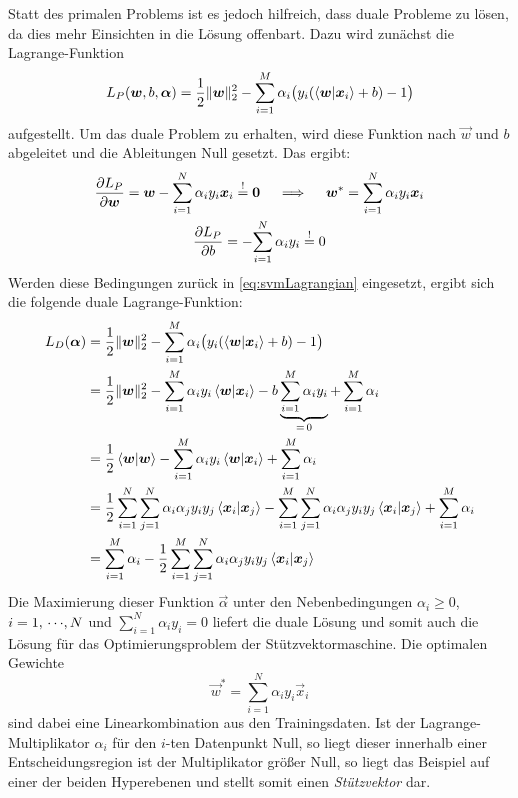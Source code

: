 				Statt des primalen Problems ist es jedoch hilfreich, dass duale Probleme zu lösen, da dies mehr Einsichten in die Lösung offenbart. Dazu wird zunächst die Lagrange-Funktion
				\begin{equation}
					L_P(\bm{w}, b, \bm{\alpha}) = \frac{1}{2} \lVert \bm{w} \rVert_2^2 - \sum_{i = 1}^{M} \alpha_i \big( y_i (\braket{\bm{w}}{\bm{x}_i} + b) - 1 \big)  \label{eq:svmLagrangian}
				\end{equation}
				aufgestellt. Um das duale Problem zu erhalten, wird diese Funktion nach \(\vec{w}\) und \(b\) abgeleitet und die Ableitungen Null gesetzt. Das ergibt:
				\begin{gather}
					\pdv{L_P}{\bm{w}} = \bm{w} - \sum_{i = 1}^{N} \alpha_i y_i \bm{x}_i \overset{!}{=} \bm{0}
					\quad\implies\quad
					\bm{w}^\ast = \sum_{i = 1}^{N} \alpha_i y_i \bm{x}_i \\
					\pdv{L_P}{b} = -\!\sum_{i = 1}^{N} \alpha_i y_i \overset{!}{=} 0
				\end{gather}
				Werden diese Bedingungen zurück in \eqref{eq:svmLagrangian} eingesetzt, ergibt sich die folgende duale Lagrange-Funktion:
				\begin{align}
					L_D(\bm{\alpha})
						&= \frac{1}{2} \lVert \bm{w} \rVert_2^2 - \sum_{i = 1}^{M} \alpha_i \big( y_i (\braket{\bm{w}}{\bm{x}_i} + b) - 1 \big) \\
						&= \frac{1}{2} \lVert \bm{w} \rVert_2^2 - \sum_{i = 1}^{M} \alpha_i y_i \braket{\bm{w}}{\bm{x}_i} - b \underbrace{\sum_{i = 1}^{M} \alpha_i y_i}_{=\, 0} + \sum_{i = 1}^{M} \alpha_i \\
						&= \frac{1}{2} \braket{\bm{w}}{\bm{w}} - \sum_{i = 1}^{M} \alpha_i y_i \braket{\bm{w}}{\bm{x}_i} + \sum_{i = 1}^{M} \alpha_i \\
						&= \frac{1}{2} \sum_{i = 1}^{N} \sum_{j = 1}^{N} \alpha_i \alpha_j y_i y_j \braket{\bm{x}_i}{\bm{x}_j} - \sum_{i = 1}^{M} \sum_{j = 1}^{N} \alpha_i \alpha_j y_i y_j \braket{\bm{x}_i}{\bm{x}_j} + \sum_{i = 1}^{M} \alpha_i \\
						&= \sum_{i = 1}^{M} \alpha_i - \frac{1}{2} \sum_{i = 1}^{M} \sum_{j = 1}^{N} \alpha_i \alpha_j y_i y_j \braket{\bm{x}_i}{\bm{x}_j}
				\end{align}
				Die Maximierung dieser Funktion \bzgl \(\vec{\alpha}\) unter den Nebenbedingungen \( \alpha_i \geq 0 \), \( i = 1,\,\cdots\!,N \) und \( \sum_{i = 1}^{N} \alpha_i y_i = 0 \) liefert die duale Lösung und somit auch die Lösung für das Optimierungsproblem der Stützvektormaschine. Die optimalen Gewichte
				\begin{equation}
					\vec{w}^\ast = \sum_{i = 1}^{N} \alpha_i y_i \vec{x}_i
				\end{equation}
				sind dabei eine Linearkombination aus den Trainingsdaten. Ist der Lagrange-Multiplikator \( \alpha_i \) für den \(i\)-ten Datenpunkt Null, so liegt dieser innerhalb einer Entscheidungsregion ist der Multiplikator größer Null, so liegt das Beispiel auf einer der beiden Hyperebenen und stellt somit einen \emph{Stützvektor} dar.

